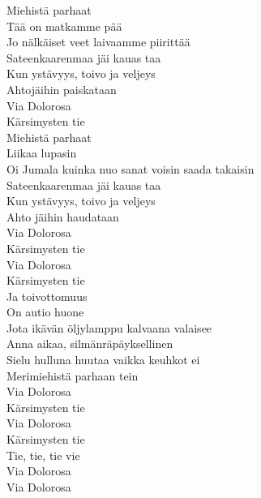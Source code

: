 Miehistä parhaat\\
Tää on matkamme pää\\
Jo nälkäiset veet laivaamme piirittää\\
Sateenkaarenmaa jäi kauas taa\\
Kun ystävyys, toivo ja veljeys\\
Ahtojäihin paiskataan\\
Via Dolorosa\\
Kärsimysten tie\\
Miehistä parhaat\\
Liikaa lupasin\\
Oi Jumala kuinka nuo sanat voisin saada takaisin\\
Sateenkaarenmaa jäi kauas taa\\
Kun ystävyys, toivo ja veljeys\\
Ahto jäihin haudataan\\
Via Dolorosa\\
Kärsimysten tie\\
Via Dolorosa\\
Kärsimysten tie\\
Ja toivottomuus\\
On autio huone\\
Jota ikävän öljylamppu kalvaana valaisee\\
Anna aikaa, silmänräpäyksellinen\\
Sielu hulluna huutaa vaikka keuhkot ei\\
Merimiehistä parhaan tein\\
Via Dolorosa\\
Kärsimysten tie\\
Via Dolorosa\\
Kärsimysten tie\\
Tie, tie, tie vie\\
Via Dolorosa\\
Via Dolorosa